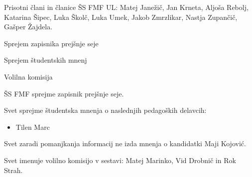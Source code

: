 \documentclass{seja}
\begin{document}
Prisotni člani in članice ŠS FMF UL:
Matej Janežič,
Jan Krneta,
Aljoša Rebolj,
Katarina Šipec,
Luka Školč,
Luka Umek,
Jakob Zmrzlikar,
Nastja Zupančič,
Gašper Žajdela.


\begin{red}
	\item
	Sprejem zapisnika prejšnje seje
    \item
    Sprejem študentskih mnenj
    \item
    Volilna komisija
\end{red}



\begin{ad}
    \item
    \begin{sklep*}
        ŠS FMF sprejme zapisnik prejšnje seje.
    \end{sklep*}
    
    \item 
    \begin{sklep*}
    Svet sprejme študentska mnenja o naslednjih pedagoških delavcih:
        \begin{itemize}
            \item Tilen Marc
        \end{itemize}
    Svet zaradi pomanjkanja informacij ne izda mnenja o kandidatki Maji Kojović.
    \end{sklep*}
    
    \item
    \begin{sklep*}
    Svet imenuje volilno komisijo v sestavi: Matej Marinko, Vid Drobnič in Rok Strah.
    \end{sklep*}
\end{ad}
\end{document}
